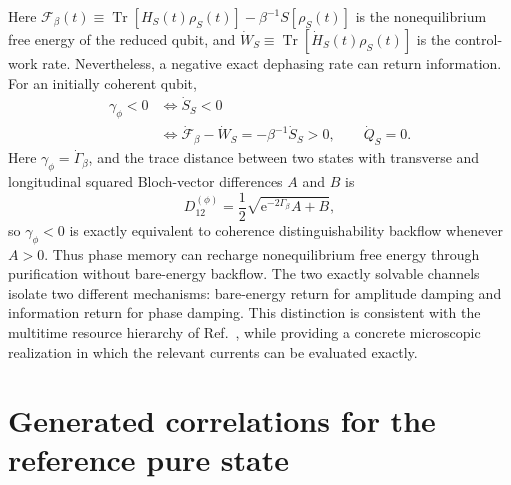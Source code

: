 \documentclass[reprint,superscriptaddress,floatfix,amsmath,amssymb,prresearch,aps]{revtex4-2}
\newcommand{\ee}{\mathrm{e}}
\newcommand{\Tr}{\operatorname{Tr}}
\begin{document}
Here \(\mathcal F_\beta(t)\equiv
\Tr[H_S(t)\rho_S(t)]-\beta^{-1}S[\rho_S(t)]\) is the nonequilibrium free
energy of the reduced qubit, and \(\dot W_S\equiv
\Tr[\dot H_S(t)\rho_S(t)]\) is the control-work rate.
Nevertheless, a negative exact dephasing rate can return information. For an
initially coherent qubit,
\begin{align}
\gamma_\phi<0
&\Longleftrightarrow \dot S_S<0\nonumber\\
&\Longleftrightarrow
\dot{\mathcal F}_\beta-\dot W_S=-\beta^{-1}\dot S_S>0,
\qquad \dot Q_S=0.
\label{eq:phasefreeenergy}
\end{align}
Here \(\gamma_\phi=\dot\Gamma_\beta\), and the trace distance between two
states with transverse and longitudinal squared Bloch-vector differences
\(A\) and \(B\) is
\begin{equation}
D_{12}^{(\phi)}=\frac12\sqrt{\ee^{-2\Gamma_\beta}A+B},
\end{equation}
so \(\gamma_\phi<0\) is exactly equivalent to coherence distinguishability
backflow whenever \(A>0\).
Thus phase memory can recharge nonequilibrium free energy through purification
without bare-energy backflow. The two exactly solvable channels isolate two
different mechanisms: bare-energy return for amplitude damping and
information return for phase damping. This distinction is consistent with the multitime
resource hierarchy of Ref.~\cite{ZambonAdesso2025}, while providing a concrete
microscopic realization in which the relevant currents can be evaluated
exactly.


\section{Generated correlations for the reference pure state}
\end{document}
